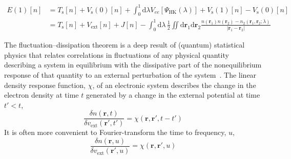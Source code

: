 \begin{equation}
\begin{aligned}
  E(1)[n]&=T_\text{s}[n]+V_\text{s}(0)[n]+\int_0^1\mathrm d\lambda V_{ee}[\Psi_\text{HK}(\lambda)]+V_\text{s}(1)[n]-V_\text{s}(0)[n] \\
  &=T_\text{s}[n]+V_\text{ext}[n]+J[n]-\int_0^1\mathrm d\lambda\,\frac12\iint\mathrm d\mathbf r_1\mathrm d\mathbf r_2\frac{n(\mathbf r_1)n(\mathbf r_2)-n_2(\mathbf r_1,\mathbf r_2;\lambda)}{|\mathbf r_1-\mathbf r_2|}
  \label{eq:energy-adiabatic}
\end{aligned}
\end{equation}

The fluctuation--dissipation theorem is a deep result of (quantum) statistical physics that relates correlations in fluctuations of any physical quantity describing a system in equilibrium with the dissipative part of the nonequilibrium response of that quantity to an external perturbation of the system~\cite{CallenPR51}.
The linear density response function, $\chi$, of an electronic system describes the change in the electron density at time $t$ generated by a change in the external potential at time $t'<t$,
\begin{equation}
  \frac{\delta n(\mathbf r,t)}{\delta v_\text{ext}(\mathbf r',t')}=\chi(\mathbf r,\mathbf r',t-t')
\end{equation}
It is often more convenient to Fourier-transform the time to frequency, $u$,
\begin{equation}
  \frac{\delta n(\mathbf r,u)}{\delta v_\text{ext}(\mathbf r',u)}=\chi(\mathbf r,\mathbf r',u)
\end{equation}

